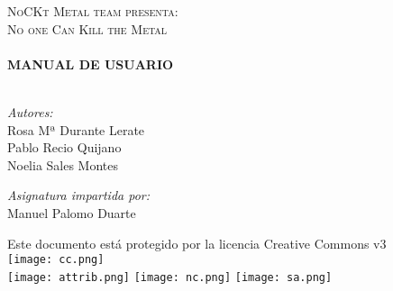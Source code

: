 \begin{titlepage}
 \begin{center}
  
  \vspace*{5cm}
  
  \textsc{\LARGE NoCKt Metal team presenta:}\\[1.5cm]
  
  \textsc{\Large No one Can Kill the Metal}\\[0.5cm]
 
  
  \HRule \\[0.4cm]
  { \huge \bfseries MANUAL DE USUARIO}\\[0.4cm]
  
  \HRule \\[1.5cm]
  
  \begin{minipage}{0.4\textwidth}
   \begin{flushleft} \large
    \emph{Autores:}\\
    Rosa Mª Durante Lerate\\
    Pablo Recio Quijano\\
    Noelia Sales Montes
   \end{flushleft}
  \end{minipage}
  \begin{minipage}{0.4\textwidth}
   \begin{flushright} \large
    \emph{Asignatura impartida por:} \\
    Manuel Palomo Duarte
   \end{flushright}
  \end{minipage}
  
  \vfill
  
 \end{center}

 \begin{center}
  \noindent Este documento está protegido por la licencia Creative
  Commons v3 \\ \texttt{[image: cc.png]} \\
  
\texttt{[image: attrib.png]}
\texttt{[image: nc.png]}
\texttt{[image: sa.png]}
\end{center}

 
\end{titlepage}
